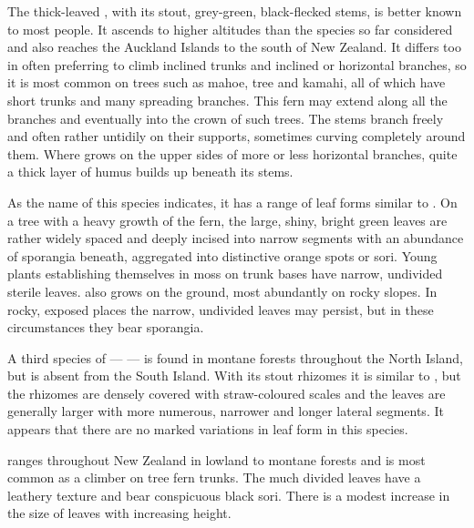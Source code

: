 The thick-leaved , with its stout, grey-green, black-flecked stems, is better known to most people.
It ascends to higher altitudes than the species so far considered and also reaches the Auckland Islands to the south of New Zealand.
It differs too in often preferring to climb inclined trunks and inclined or horizontal branches, so it is most common on trees such as mahoe, tree  and kamahi, all of which have short trunks and many spreading branches.
This fern may extend along all the branches and eventually into the crown of such trees.
The stems branch freely and often rather untidily on their supports, sometimes curving completely around them.
Where  grows on the upper sides of more or less horizontal branches, quite a thick layer of humus builds up beneath its stems.

As the name of this species indicates, it has a range of leaf forms similar to .
On a tree with a heavy growth of the fern, the large, shiny, bright green leaves are rather widely spaced and deeply incised into narrow segments with an abundance of sporangia beneath, aggregated into distinctive orange spots or sori.
Young plants establishing themselves in moss on trunk bases have narrow, undivided sterile leaves.  also grows on the ground, most abundantly on rocky slopes.
In rocky, exposed places the narrow, undivided leaves may persist, but in these circumstances they bear sporangia.

A third species of  —  — is found in montane forests throughout the North Island, but is absent from the South Island.
With its stout rhizomes it is similar to , but the rhizomes are densely covered with straw-coloured scales and the leaves are generally larger with more numerous, narrower and longer lateral segments.
It appears that there are no marked variations in leaf form in this species.

 ranges throughout New Zealand in lowland to montane forests and is most common as a climber on tree fern trunks.
The much divided leaves have a leathery texture and bear conspicuous black sori.
There is a modest increase in the size of leaves with increasing height.

